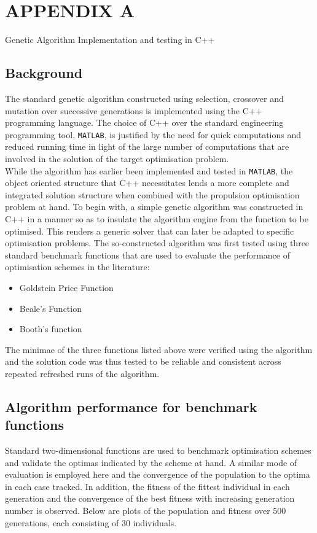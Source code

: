 \documentclass[ExampleMasters.tex]{subfiles}
\begin{document}
	\chapter{APPENDIX A}
	{\Large Genetic Algorithm Implementation and testing in C++}

	\section{Background}
		The standard genetic algorithm constructed using selection, crossover and mutation over successive generations is implemented using the C++ programming language. The choice of C++ over the standard engineering programming tool, \verb!MATLAB!, is justified by the need for quick computations and reduced running time in light of the large number of computations that are involved in the solution of the target optimisation problem. \\

		While the algorithm has earlier been implemented and tested in \verb!MATLAB!, the object oriented structure that C++ necessitates lends a more complete and integrated solution structure when combined with the propulsion optimisation problem at hand. To begin with, a simple genetic algorithm was constructed in C++ in a manner so as to insulate the algorithm engine from the function to be optimised. This renders a generic solver that can later be adapted to specific optimisation problems. The so-constructed algorithm was first tested using three standard benchmark functions that are used to evaluate the performance of optimisation schemes in the literature:
		\begin{itemize}
			\item Goldstein Price Function
			\item Beale's Function
			\item Booth's function
		\end{itemize}

		The minimae of the three functions listed above were verified using the algorithm and the solution code was thus tested to be reliable and consistent across repeated refreshed runs of the algorithm.\\

	\section{Algorithm performance for benchmark functions}

		Standard two-dimensional functions are used to benchmark optimisation schemes and validate the optimas indicated by the scheme at hand. A similar mode of evaluation is employed here and the convergence of the population to the optima in each case tracked. In addition, the fitness of the fittest individual in each generation and the convergence of the best fitness with increasing generation number is observed. Below are plots of the population and fitness over 500 generations, each consisting of 30 individuals.\\ 
\end{document}
